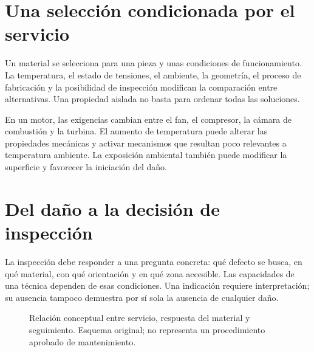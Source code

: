 \section{Una selección condicionada por el servicio}
Un material se selecciona para una pieza y unas condiciones de funcionamiento. La temperatura, el estado de tensiones, el ambiente, la geometría, el proceso de fabricación y la posibilidad de inspección modifican la comparación entre alternativas. Una propiedad aislada no basta para ordenar todas las soluciones.

En un motor, las exigencias cambian entre el fan, el compresor, la cámara de combustión y la turbina. El aumento de temperatura puede alterar las propiedades mecánicas y activar mecanismos que resultan poco relevantes a temperatura ambiente. La exposición ambiental también puede modificar la superficie y favorecer la iniciación del daño.


\section{Del daño a la decisión de inspección}
La inspección debe responder a una pregunta concreta: qué defecto se busca, en qué material, con qué orientación y en qué zona accesible. Las capacidades de una técnica dependen de esas condiciones. Una indicación requiere interpretación; su ausencia tampoco demuestra por sí sola la ausencia de cualquier daño.

\begin{figure}[htbp]
\centering
{}
\caption{Relación conceptual entre servicio, respuesta del material y seguimiento. Esquema original; no representa un procedimiento aprobado de mantenimiento.}
\label{fig:servicio}
\end{figure}

